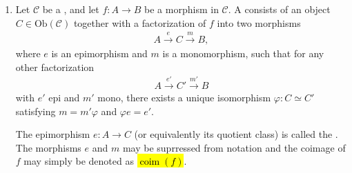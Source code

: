 \begin{definition}
\begin{enumerate}
    \item
    Let $\mathcal{C}$ be a , and let $f: A \to B$ be a morphism in $\mathcal{C}$. A  consists of an object $C \in \mathrm{Ob}(\mathcal{C})$ together with a factorization of $f$ into two morphisms
        \begin{align*}
        A \xrightarrow{e} C \xrightarrow{m} B,
        \end{align*}
    where $e$ is an epimorphism and $m$ is a monomorphism, such that for any other factorization
        \begin{align*}
        A \xrightarrow{e'} C' \xrightarrow{m'} B
        \end{align*}
    with $e'$ epi and $m'$ mono, there exists a unique isomorphism $\varphi: C \simeq C'$ satisfying $m = m'\varphi$ and $\varphi e = e'$.
    \begin{center}
    \end{center}
    The epimorphism $e: A \to C$ (or equivalently its quotient class) is called the . The morphisms $e$ and $m$ may be suprressed from notation and the coimage of $f$ may simply be denoted as \hl{$\operatorname{coim}(f)$}.



\end{enumerate}
\end{definition}